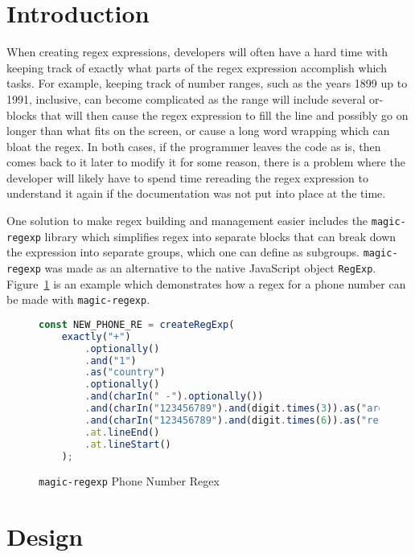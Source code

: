 \documentclass[conference]{IEEEtran}
\begin{document}
\section{Introduction}
When creating regex expressions, developers will often have a hard time with keeping track of exactly
what parts of the regex expression accomplish which tasks. For example, keeping track of number ranges,
such as the years 1899 up to 1991, inclusive, can become complicated as the range will include several or-blocks that
will then cause the regex expression to fill the line and possibly go on longer than what fits on the screen,
or cause a long word wrapping which can bloat the regex.
In both cases, if the programmer leaves the code as is, then comes back to it later to modify it for some reason,
there is a problem where the developer will likely have to spend time rereading the regex expression to understand
it again if the documentation was not put into place at the time.

One solution to make regex building and management easier includes the \texttt{magic-regexp} library
which simplifies regex into separate blocks that can break down the expression into separate
groups, which one can define as subgroups.\cite{magic-regexp}
\texttt{magic-regexp} was made as an alternative to the native JavaScript object \texttt{RegExp}.
Figure~\ref{fig:magic-regexp-phonenum-regex} is an example which demonstrates how a regex for a phone number can be made with
\texttt{magic-regexp}. \cite{omereshone2023}

\vfill\eject

\begin{figure}[htbp]
    \centering
    \label{fig:magic-regexp-phonenum-regex}
    \begin{lstlisting}[language=JavaScript]
const NEW_PHONE_RE = createRegExp(
    exactly("+")
        .optionally()
        .and("1")
        .as("country")
        .optionally()
        .and(charIn(" -").optionally())
        .and(charIn("123456789").and(digit.times(3)).as("area"))
        .and(charIn("123456789").and(digit.times(6)).as("rest"))
        .at.lineEnd()
        .at.lineStart()
    );
    \end{lstlisting}
    \caption{\texttt{magic-regexp} Phone Number Regex}
\end{figure}

\section{Design}
\end{document}
